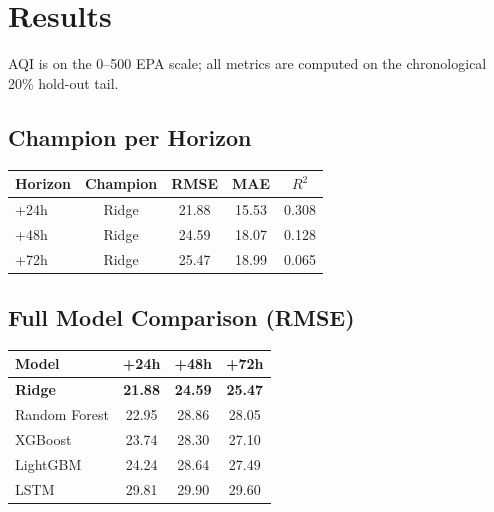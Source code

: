 \documentclass[11pt,a4paper]{article}
\newcommand{\rsq}{$R^2$}
\begin{document}
\section{Results}
AQI is on the 0--500 EPA scale; all metrics are computed on the chronological
20\% hold-out tail.

\subsection{Champion per Horizon}
\begin{center}
\begin{tabular}{@{}lcccc@{}}
\toprule
\textbf{Horizon} & \textbf{Champion} & \textbf{RMSE} & \textbf{MAE} & \textbf{\rsq{}} \\
\midrule
+24h & Ridge & 21.88 & 15.53 & 0.308 \\
+48h & Ridge & 24.59 & 18.07 & 0.128 \\
+72h & Ridge & 25.47 & 18.99 & 0.065 \\
\bottomrule
\end{tabular}
\end{center}

\subsection{Full Model Comparison (RMSE)}
\begin{center}
\begin{tabular}{@{}lccc@{}}
\toprule
\textbf{Model} & \textbf{+24h} & \textbf{+48h} & \textbf{+72h} \\
\midrule
\textbf{Ridge} & \textbf{21.88} & \textbf{24.59} & \textbf{25.47} \\
Random Forest  & 22.95 & 28.86 & 28.05 \\
XGBoost        & 23.74 & 28.30 & 27.10 \\
LightGBM       & 24.24 & 28.64 & 27.49 \\
LSTM           & 29.81 & 29.90 & 29.60 \\
\bottomrule
\end{tabular}
\end{center}
\end{document}
